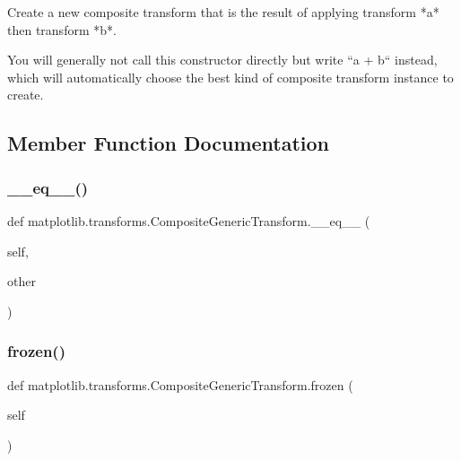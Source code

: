 \begin{DoxyVerb}Create a new composite transform that is the result of
applying transform *a* then transform *b*.

You will generally not call this constructor directly but write ``a +
b`` instead, which will automatically choose the best kind of composite
transform instance to create.
\end{DoxyVerb}
 

\subsection{Member Function Documentation}
\mbox{\label{classmatplotlib_1_1transforms_1_1CompositeGenericTransform_a9f7e74868afe5fdb0cae8b0478a85aa4}} 
\subsubsection{\texorpdfstring{\+\_\+\+\_\+eq\+\_\+\+\_\+()}{\_\_eq\_\_()}}
{\footnotesize\ttfamily def matplotlib.\+transforms.\+Composite\+Generic\+Transform.\+\_\+\+\_\+eq\+\_\+\+\_\+ (\begin{DoxyParamCaption}\item[{}]{self,  }\item[{}]{other }\end{DoxyParamCaption})}

\mbox{\label{classmatplotlib_1_1transforms_1_1CompositeGenericTransform_a42e8c9bf008883e09da6e522d0c8fd3c}} 
\subsubsection{\texorpdfstring{frozen()}{frozen()}}
{\footnotesize\ttfamily def matplotlib.\+transforms.\+Composite\+Generic\+Transform.\+frozen (\begin{DoxyParamCaption}\item[{}]{self }\end{DoxyParamCaption})}


